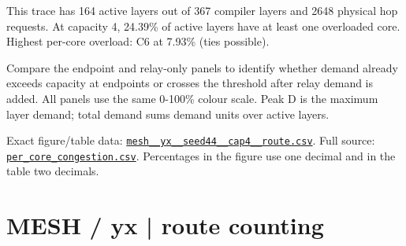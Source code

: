 \documentclass[10pt,a4paper]{article}
\begin{document}
This trace has 164 active layers out of 367 compiler layers and 2648 physical hop requests. At capacity 4, 24.39\% of active layers have at least one overloaded core. Highest per-core overload: C6 at 7.93\% (ties possible).\par
Compare the endpoint and relay-only panels to identify whether demand already exceeds capacity at endpoints or crosses the threshold after relay demand is added. All panels use the same 0-100\% colour scale. Peak D is the maximum layer demand; total demand sums demand units over active layers.\par
Exact figure/table data: \href{\detokenize{file:///home/dhruv-pansuriya/Documents/BTP/Compiler-Driven-ACE/output/pdf/qaoa_methods_congestion/tables/mesh__yx__seed44__cap4__route.csv}}{\nolinkurl{mesh__yx__seed44__cap4__route.csv}}. Full source: \href{\detokenize{file:///home/dhruv-pansuriya/Documents/BTP/Compiler-Driven-ACE/results/qaoa_2seed_2026-10-26/congestion/per_core_congestion.csv}}{\nolinkurl{per_core_congestion.csv}}. Percentages in the figure use one decimal and in the table two decimals.\par
\clearpage
\section*{MESH / yx | route counting}
\end{document}
